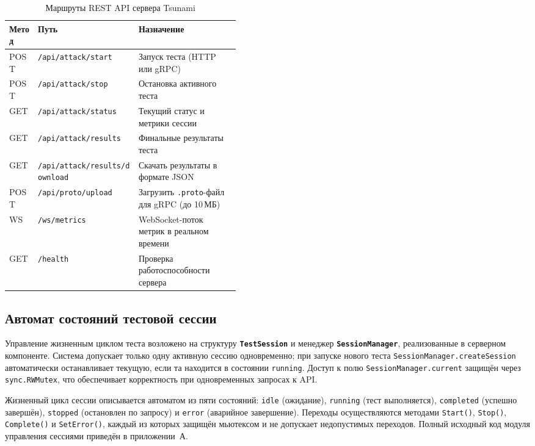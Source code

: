 \begin{table}[h!]
  \centering
  \caption{Маршруты REST API сервера Tsunami}
  \label{tab:ch2-api}
  \small
  \begin{tabular}{|l|l|p{0.44\linewidth}|}
    \hline
    \textbf{Метод} & \textbf{Путь} & \textbf{Назначение} \\
    \hline
    POST & \texttt{/api/attack/start} & Запуск теста (HTTP или gRPC) \\
    \hline
    POST & \texttt{/api/attack/stop} & Остановка активного теста \\
    \hline
    GET  & \texttt{/api/attack/status} & Текущий статус и метрики сессии \\
    \hline
    GET  & \texttt{/api/attack/results} & Финальные результаты теста \\
    \hline
    GET  & \texttt{/api/attack/results/download} & Скачать результаты в формате JSON \\
    \hline
    POST & \texttt{/api/proto/upload} & Загрузить \texttt{.proto}-файл для gRPC (до 10\,МБ) \\
    \hline
    WS   & \texttt{/ws/metrics} & WebSocket-поток метрик в реальном времени \\
    \hline
    GET  & \texttt{/health} & Проверка работоспособности сервера \\
    \hline
  \end{tabular}
\end{table}

\subsection*{Автомат состояний тестовой сессии}

Управление жизненным циклом теста возложено на структуру \textbf{\texttt{TestSession}} и менеджер \textbf{\texttt{SessionManager}}, реализованные в серверном компоненте.
Система допускает только одну активную сессию одновременно; при запуске нового теста \texttt{SessionManager.createSession} автоматически останавливает текущую, если та находится в состоянии \texttt{running}.
Доступ к полю \texttt{SessionManager.current} защищён через \texttt{sync.RWMutex}, что обеспечивает корректность при одновременных запросах к API.

Жизненный цикл сессии описывается автоматом из пяти состояний: \texttt{idle} (ожидание), \texttt{running} (тест выполняется), \texttt{completed} (успешно завершён), \texttt{stopped} (остановлен по запросу) и \texttt{error} (аварийное завершение).
Переходы осуществляются методами \texttt{Start()}, \texttt{Stop()}, \texttt{Complete()} и \texttt{SetError()}, каждый из которых защищён мьютексом и не допускает недопустимых переходов.
Полный исходный код модуля управления сессиями приведён в приложении~А.

